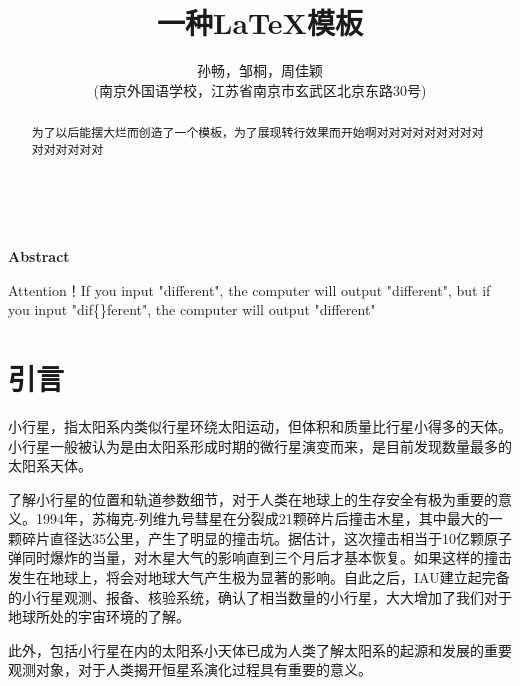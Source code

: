 \documentclass[12pt,a4paper]{article}%
\title{\fontsize{18pt}{27pt}\selectfont%
	{\heiti%
		一种\LaTeX 模板}}%
\author{\fontsize{12pt}{18pt}\selectfont%
	{\fangsong%
		孙畅，邹桐，周佳颖 }\\%
	\fontsize{10.5pt}{15.75pt}\selectfont%
	{\fangsong%
		(南京外国语学校，江苏省南京市玄武区北京东路30号)}}%
\date{}%
\begin{document}
\maketitle%
\lhead{}%
\chead{}%
\rhead{}%
\lfoot{}%
\cfoot{\thepage}%
\rfoot{}%
\begin{abstract}
    \fangsong 为了以后能摆大烂而创造了一个模板，为了展现转行效果而开始啊对对对对对对对对对对对对对对对
\end{abstract}

\begin{adjustwidth}{1.06cm}{1.06cm}
    \fontsize{10.5pt}{15.75pt}\\
\end{adjustwidth}

\begin{center}%
    {\textbf{Abstract}}%
\end{center}
\begin{adjustwidth}{1.06cm}{1.06cm}%
    \hspace{1.5em}Attention！If you input "dif{}ferent", the computer will output "different", but if you input "dif\{\}ferent", the computer will output "dif{}ferent"
\end{adjustwidth}
\newpage%

\section{引言}

小行星，指太阳系内类似行星环绕太阳运动，但体积和质量比行星小得多的天体。小行星一般被认为是由太阳系形成时期的微行星演变而来，是目前发现数量最多的太阳系天体。

了解小行星的位置和轨道参数细节，对于人类在地球上的生存安全有极为重要的意义。1994年，苏梅克-列维九号彗星在分裂成21颗碎片后撞击木星，其中最大的一颗碎片直径达35公里，产生了明显的撞击坑。据估计，这次撞击相当于10亿颗原子弹同时爆炸的当量，对木星大气的影响直到三个月后才基本恢复。如果这样的撞击发生在地球上，将会对地球大气产生极为显著的影响。自此之后，IAU建立起完备的小行星观测、报备、核验系统，确认了相当数量的小行星，大大增加了我们对于地球所处的宇宙环境的了解。

此外，包括小行星在内的太阳系小天体已成为人类了解太阳系的起源和发展的重要观测对象，对于人类揭开恒星系演化过程具有重要的意义。
\end{document}
